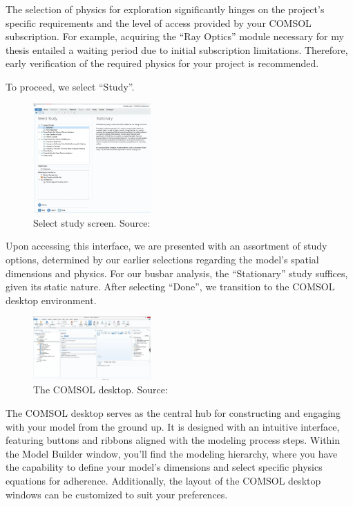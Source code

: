 The selection of physics for exploration significantly hinges on the project's specific requirements and the level of access provided by your COMSOL subscription. For example, acquiring the ``Ray Optics'' module necessary for my thesis entailed a waiting period due to initial subscription limitations. Therefore, early verification of the required physics for your project is recommended.

To proceed, we select ``Study''.

\begin{figure}[ht!]
  \centering
  \includegraphics[width=0.4\textwidth]{Chapters/Figures/Chapter 3 Figures/Select Study.png}
  \caption{Select study screen. Source: \cite{multiphysics__modeling_nodate}}
  \label{fig:Select Study}
\end{figure}

Upon accessing this interface, we are presented with an assortment of study options, determined by our earlier selections regarding the model's spatial dimensions and physics. For our busbar analysis, the ``Stationary'' study suffices, given its static nature. After selecting ``Done'', we transition to the COMSOL desktop environment.

\begin{figure}[ht!]
  \centering
  \includegraphics[width=0.4\textwidth]{Chapters/Figures/Chapter 3 Figures/Initial COMSOL Desktop.png}
  \caption{The COMSOL desktop. Source: \cite{multiphysics__modeling_nodate}}
  \label{fig:The COMSOL desktop}
\end{figure}

The COMSOL desktop serves as the central hub for constructing and engaging with your model from the ground up. It is designed with an intuitive interface, featuring buttons and ribbons aligned with the modeling process steps. Within the Model Builder window, you'll find the modeling hierarchy, where you have the capability to define your model's dimensions and select specific physics equations for adherence. Additionally, the layout of the COMSOL desktop windows can be customized to suit your preferences.

